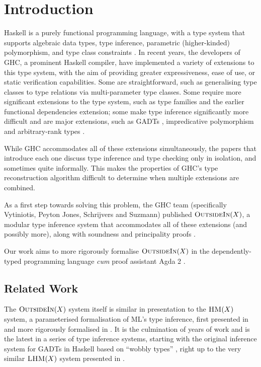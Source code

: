 \documentclass[a4paper]{jfp}
\newcommand{\outsidein}{\textsc{OutsideIn}(X)}
\begin{document}
             \vspace*{\fill}
\newpage

\section{Introduction}

Haskell is a purely functional programming language, with a type system that supports algebraic data types, type inference, parametric (higher-kinded)
polymorphism, and type class constraints \cite{Anonymous:2010we}. In recent years, the developers of GHC, a prominent Haskell compiler, have
implemented a variety of extensions to this type system, with the aim of providing greater expressiveness, ease of use, or static verification
capabilities. Some are straightforward, such as generalising type classes to type relations via multi-parameter type classes. Some require more
significant extensions to the type system, such as type families \cite{citeulike:9320233} and the earlier functional dependencies extension; some make
type inference significantly more difficult and are major extensions, such as GADTs \cite{Schrijvers:2009jg}, impredicative polymorphism and
arbitrary-rank types \cite{Jones:2007dr}.

While GHC accommodates all of these extensions simultaneously, the papers that introduce each one discuss type inference and type checking only in
isolation, and sometimes quite informally. This makes the properties of GHC's type reconstruction algorithm difficult to determine when multiple
extensions are combined.  

As a first step towards solving this problem, the GHC team (specifically Vytiniotis, Peyton Jones, Schrijvers and Suzmann) published $\outsidein$, a
modular type inference system that accommodates all of these extensions (and possibly more), along with soundness and principality proofs
\cite{Vytiniotis:2011:OMT:2139531.2139533}. 

Our work aims to more rigorously formalise $\outsidein$ in the dependently-typed programming language \emph{cum} proof assistant Agda 2
\cite{conf/afp/norell08}.

\subsection{Related Work}

The $\outsidein$ system itself is similar in presentation to the $\textsc{HM}(X)$ system, a parameterised formalisation of ML's type inference, first
presented in \cite{Odersky97typeinference} and more rigorously formalised in \cite{Pottier:2005ue}. It is the culmination of years of work and is the
latest in a series of type inference systems, starting with the original inference system for GADTs in Haskell based on ``wobbly types''
\cite{Schrijvers:2009jg}, right up to the very similar $\textsc{LHM}(X)$ system presented in \cite{Vytiniotis:2010ja}. 
\end{document}
